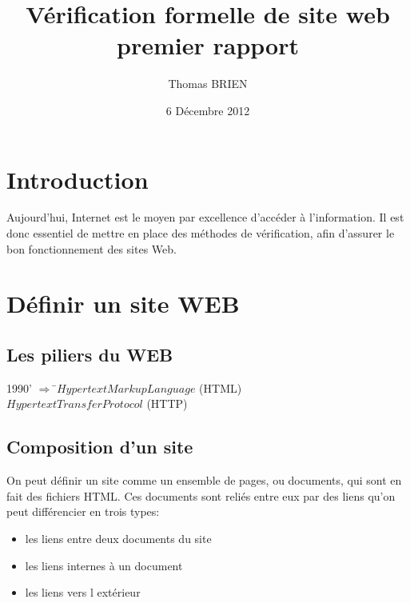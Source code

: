 \documentclass[a4paper]{report}
\title{Vérification formelle de site web\\premier rapport}
\author{Thomas BRIEN}
\date{6 Décembre 2012}
\begin{document}
\maketitle
\tableofcontents



\chapter*{Introduction}
Aujourd'hui, Internet est le moyen par excellence d'accéder à l'information. 
Il est donc essentiel de mettre en place des méthodes de vérification, afin d'assurer le bon fonctionnement des sites Web.\\



\chapter*{Définir un site WEB}
\section{Les piliers du WEB\\}
\begin{tabbing}
1990' $ \Rightarrow$ \=$Hypertext Markup Language$ (HTML)\\
       \>$Hypertext Transfer Protocol$ (HTTP)\\
\end{tabbing}

\section{Composition d'un site\\}
On peut définir un site comme un ensemble de pages, ou documents, qui sont en fait des fichiers HTML. Ces documents sont reliés entre eux par des liens qu'on peut différencier en trois types:\\
\begin{itemize}
\item les liens entre deux documents du site
\item les liens internes à un document
\item les liens vers l extérieur
\end{itemize}
\end{document}
